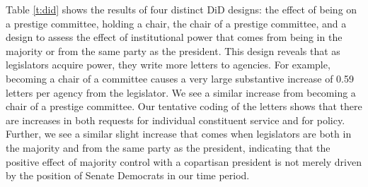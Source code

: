 \documentclass{article}
\begin{document}
Table \ref{t:did} shows the results of four distinct DiD designs: the effect of being on a prestige committee, holding a chair, the chair of a prestige committee, and a design to assess the effect of institutional power that comes from being in the majority or from the same party as the president.  This design reveals that as legislators acquire power, they write more letters to agencies.  For example, becoming a chair of a committee causes a very large substantive increase of 0.59 letters per agency from the legislator.  We see a similar increase from becoming a chair of a prestige committee.  Our tentative coding of the letters shows that there are increases in both requests for individual constituent service and for policy.  Further, we see a similar slight increase that comes when legislators are both in the majority and from the same party as the president, indicating that the positive effect of majority control with a copartisan president is not merely driven by the position of Senate Democrats in our time period. 
\end{document}
